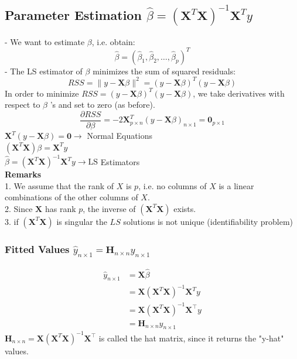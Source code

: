\documentclass[11pt,a4paper]{article}
\begin{document}
\subsection{Parameter Estimation $\hat{\beta}=\left(\mathbf{X}^{T} \mathbf{X}\right)^{-1} \mathbf{X}^{T} y$}
- We want to estimate $\beta$, i.e. obtain:
$$
\hat{\beta}=\left(\hat{\beta}_{1}, \hat{\beta}_{2}, \ldots, \hat{\beta}_{p}\right)^{T}
$$
- The LS estimator of $\beta$ minimizes the sum of squared residuals:
$$
R S S=\|y-\mathbf{X} \beta\|^{2}=(y-\mathbf{X} \beta)^{T}(y-\mathbf{X} \beta)
$$
In order to minimize $R S S=(y-\mathbf{X} \beta)^{T}(y-\mathbf{X} \beta)$, we take derivatives with respect to $\beta$ 's and set to zero (as before).\\
$$\frac{\partial R S S}{\partial \beta}=-2 \mathbf{X}_{p \times n}^{T}(y-\mathbf{X} \beta)_{n \times 1}=\mathbf{0}_{p \times 1}$$
$\mathbf{X}^{T}(y-\mathbf{X} \beta)=\mathbf{0} \longrightarrow$ Normal Equations\\
$\left(\mathbf{X}^{T} \mathbf{X}\right) \beta=\mathbf{X}^{T} y$\\
$\hat{\beta}=\left(\mathbf{X}^{T} \mathbf{X}\right)^{-1} \mathbf{X}^{T} y \rightarrow \mathrm{LS}$ Estimators\\
\textbf{Remarks}\\
1. We assume that the rank of $X$ is $p$, i.e. no columns of $X$ is a linear combinations of the other columns of $X$.\\
2. Since $\mathbf{X}$ has rank $p$, the inverse of $\left(\mathbf{X}^{T} \mathbf{X}\right)$ exists.\\
3. if $\left(\mathbf{X}^{T} \mathbf{X}\right)$ is singular the $LS$ solutions is not unique (identiﬁability problem)

\subsubsection{Fitted Values $\hat{y}_{n \times 1}=\mathbf{H}_{n \times n} y_{n \times 1}$}
$$
\begin{aligned}
\hat{y}_{n \times 1} &=\mathbf{X} \hat{\beta} \\
&=\mathbf{X}\left(\mathbf{X}^{T} \mathbf{X}\right)^{-1} \mathbf{X}^{T} y \\
&=\mathbf{X}\left(\mathbf{X}^{T} \mathbf{X}\right)^{-1} \mathbf{X}^{\top} y\\&=\mathbf{H}_{n \times n} y_{n \times 1}
\end{aligned}
$$
$\mathbf{H}_{n \times n}=\mathbf{X}\left(\mathbf{X}^{T} \mathbf{X}\right)^{-1} \mathbf{X}^{\top}$ is called the hat matrix, since it returns the "y-hat" values.
\end{document}
